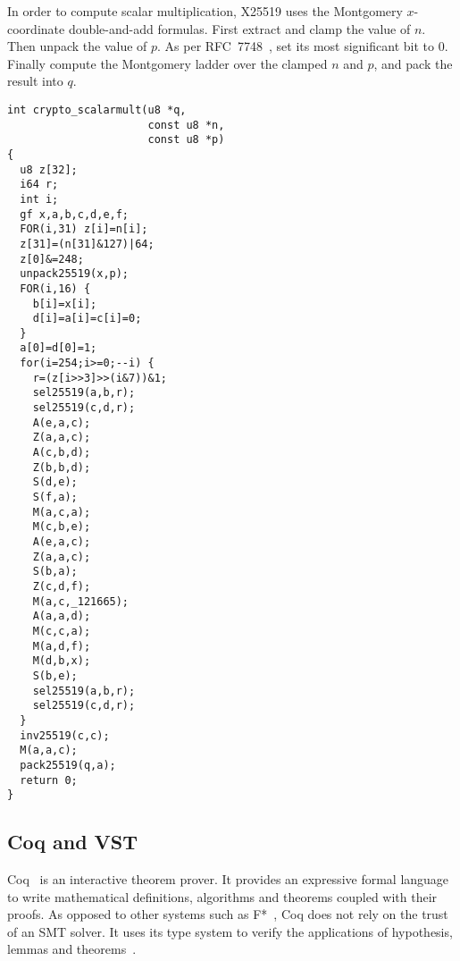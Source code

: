 In order to compute scalar multiplication, X25519 uses the Montgomery
$x$-coordinate double-and-add formulas.
First extract and clamp the value of $n$. Then unpack the value of $p$.
As per RFC~7748~\cite{rfc7748}, set its most significant bit to 0.
Finally compute the Montgomery ladder over the clamped $n$ and $p$,
and pack the result into $q$.
\begin{lstlisting}[language=Ctweetnacl]
int crypto_scalarmult(u8 *q,
                      const u8 *n,
                      const u8 *p)
{
  u8 z[32];
  i64 r;
  int i;
  gf x,a,b,c,d,e,f;
  FOR(i,31) z[i]=n[i];
  z[31]=(n[31]&127)|64;
  z[0]&=248;
  unpack25519(x,p);
  FOR(i,16) {
    b[i]=x[i];
    d[i]=a[i]=c[i]=0;
  }
  a[0]=d[0]=1;
  for(i=254;i>=0;--i) {
    r=(z[i>>3]>>(i&7))&1;
    sel25519(a,b,r);
    sel25519(c,d,r);
    A(e,a,c);
    Z(a,a,c);
    A(c,b,d);
    Z(b,b,d);
    S(d,e);
    S(f,a);
    M(a,c,a);
    M(c,b,e);
    A(e,a,c);
    Z(a,a,c);
    S(b,a);
    Z(c,d,f);
    M(a,c,_121665);
    A(a,a,d);
    M(c,c,a);
    M(a,d,f);
    M(d,b,x);
    S(b,e);
    sel25519(a,b,r);
    sel25519(c,d,r);
  }
  inv25519(c,c);
  M(a,a,c);
  pack25519(q,a);
  return 0;
}
\end{lstlisting}

\subsection{Coq and VST}
\label{preliminaries:C}


Coq~\cite{coq-faq} is an interactive theorem prover. It provides an expressive
formal language to write mathematical definitions, algorithms and theorems coupled
with their proofs. As opposed to other systems such as F*~\cite{DBLP:journals/corr/BhargavanDFHPRR17},
Coq does not rely on the trust of an SMT solver. It uses its type
system to verify the applications of hypothesis, lemmas and theorems~\cite{Howard1995-HOWTFN}.

